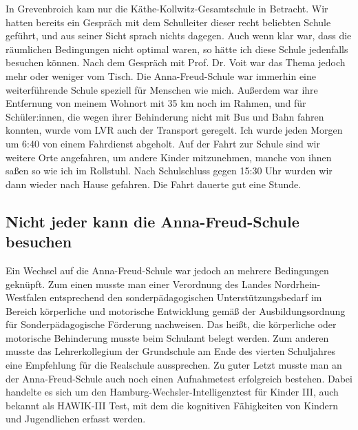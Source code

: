 \documentclass[fontsize=14pt,a4paper,headinclude,DIV=calc,automark]{scrbook}
\begin{document}
In Grevenbroich kam nur die Käthe-Kollwitz-Gesamtschule in Betracht. Wir hatten bereits ein Gespräch mit dem Schulleiter dieser recht beliebten Schule geführt, und aus seiner Sicht sprach nichts dagegen. Auch wenn klar war, dass die räumlichen Bedingungen nicht optimal waren, so hätte ich diese Schule jedenfalls besuchen können. Nach dem Gespräch mit Prof. Dr. Voit war das Thema jedoch mehr oder weniger vom Tisch. Die Anna-Freud-Schule war immerhin eine weiterführende Schule speziell für Menschen wie mich. Außerdem war ihre Entfernung von meinem Wohnort mit 35 km noch im Rahmen, und für Schüler:innen, die wegen ihrer Behinderung nicht mit Bus und Bahn fahren konnten, wurde vom LVR auch der Transport geregelt. Ich wurde jeden Morgen um 6:40 von einem Fahrdienst abgeholt. Auf der Fahrt zur Schule sind wir weitere Orte angefahren, um andere Kinder mitzunehmen, manche von ihnen saßen so wie ich im Rollstuhl. Nach Schulschluss gegen 15:30 Uhr wurden wir dann wieder nach Hause gefahren. Die Fahrt dauerte gut eine Stunde.

\subsection{Nicht jeder kann die Anna-Freud-Schule besuchen}

Ein Wechsel auf die Anna-Freud-Schule war jedoch an mehrere Bedingungen geknüpft. Zum einen musste man einer Verordnung des Landes Nordrhein-Westfalen entsprechend den sonderpädagogischen Unterstützungsbedarf im Bereich körperliche und motorische Entwicklung gemäß der Ausbildungsordnung für Sonderpädagogische Förderung nachweisen. Das heißt, die körperliche oder motorische Behinderung musste beim Schulamt belegt werden. Zum anderen musste das Lehrerkollegium der Grundschule am Ende des vierten Schuljahres eine Empfehlung für die Realschule aussprechen. Zu guter Letzt musste man an der Anna-Freud-Schule auch noch einen Aufnahmetest erfolgreich bestehen. Dabei handelte es sich um den Hamburg-Wechsler-Intelligenztest für Kinder III, auch bekannt als HAWIK-III Test, mit dem die kognitiven Fähigkeiten von Kindern und Jugendlichen erfasst werden.
\end{document}
